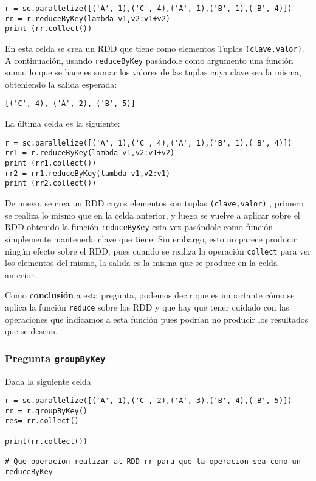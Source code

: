 \documentclass[11pt]{article}
\def\inline{\lstinline[basicstyle=\ttfamily,keywordstyle={}]}
\begin{document}
\begin{verbatim}
r = sc.parallelize([('A', 1),('C', 4),('A', 1),('B', 1),('B', 4)])
rr = r.reduceByKey(lambda v1,v2:v1+v2)
print (rr.collect())
\end{verbatim}

En esta celda se crea un RDD que tiene como elementos Tuplas \inline{(clave,valor)}. A continuación, usando \inline{reduceByKey} pasándole como argumento una función suma, lo que se hace es sumar los valores de las tuplas cuya clave sea la misma, obteniendo la salida esperada:

\begin{verbatim}
[('C', 4), ('A', 2), ('B', 5)]
\end{verbatim}

La última celda es la siguiente:

\begin{verbatim}
r = sc.parallelize([('A', 1),('C', 4),('A', 1),('B', 1),('B', 4)])
rr1 = r.reduceByKey(lambda v1,v2:v1+v2)
print (rr1.collect())
rr2 = rr1.reduceByKey(lambda v1,v2:v1)
print (rr2.collect())
\end{verbatim}

De nuevo, se crea un RDD cuyos elementos son tuplas \inline{(clave,valor)} , primero se realiza lo mismo que en la celda anterior, y luego se vuelve a aplicar sobre el RDD obtenido la función \inline{reduceByKey} esta vez pasándole como función simplemente mantenerla clave que tiene. Sin embargo, esto no parece producir ningún efecto sobre el RDD, pues cuando se realiza la operación \inline{collect} para ver los elementos del mismo, la salida es la misma que se produce en la celda anterior.

Como \textbf{conclusión} a esta pregunta, podemos decir que es importante cómo se aplica la función \inline{reduce} sobre los RDD y que hay que tener cuidado con las operaciones que indicamos a esta función pues podrían no producir los resultados que se desean. 

\subsubsection*{ Pregunta \inline{groupByKey}}

Dada la siguiente celda

\begin{verbatim}
r = sc.parallelize([('A', 1),('C', 2),('A', 3),('B', 4),('B', 5)])
rr = r.groupByKey()
res= rr.collect()

print(rr.collect())

# Que operacion realizar al RDD rr para que la operacion sea como un reduceByKey
\end{verbatim}
\end{document}
